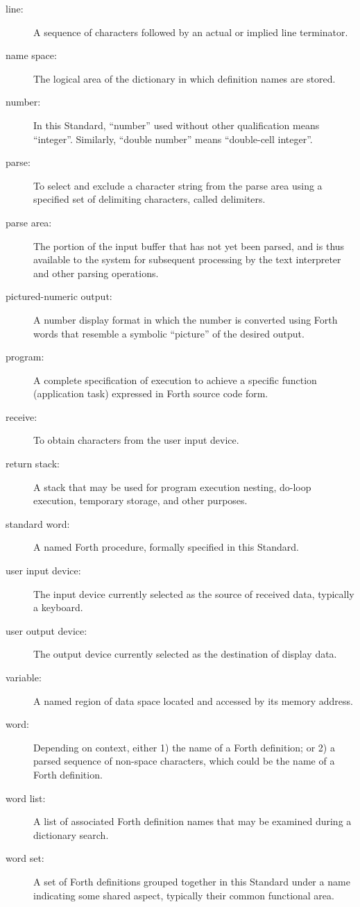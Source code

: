 \begin{description}
\item[line:]
A sequence of characters followed by an actual or implied line
terminator.

\item[name space:]
The logical area of the dictionary in which definition names are
stored.

\item[number:]
In this Standard, ``number'' used without other qualification means
``integer''. Similarly, ``double number'' means ``double-cell integer''.

\item[parse:]
To select and exclude a character string from the parse area using
a specified set of delimiting characters, called delimiters.

\item[parse area:]
The portion of the input buffer that has not yet been parsed, and
is thus available to the system for subsequent processing by the
text interpreter and other parsing operations.

\item[pictured-numeric output:]
A number display format in which the number is converted using
Forth words that resemble a symbolic ``picture'' of the desired
output.

\item[program:]
A complete specification of execution to achieve a specific function
(application task) expressed in Forth source code form.

\item[receive:]
To obtain characters from the user input device.

\item[return stack:]
A stack that may be used for program execution nesting, do-loop
execution, temporary storage, and other purposes.

\item[standard word:]
A named Forth procedure, formally specified in this Standard.

\item[user input device:]
The input device currently selected as the source of received
data, typically a keyboard.

\item[user output device:]
The output device currently selected as the destination of
display data.

\item[variable:]
A named region of data space located and accessed by its memory
address.

\item[word:]
Depending on context, either
1) the name of a Forth definition; or
2) a parsed sequence of non-space characters,
which could be the name of a Forth definition.

\item[word list:]
A list of associated Forth definition names that may be examined
during a dictionary search.

\item[word set:]
A set of Forth definitions grouped together in this Standard
under a name indicating some shared aspect, typically their
common functional area.
\end{description}

